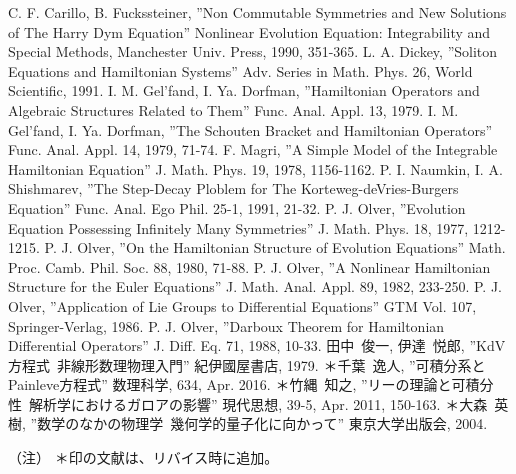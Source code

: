 \documentclass[a4paper, 11pt]{report}
\theoremstyle{definition}
\begin{document}
\newpage

\begin{thebibliography}{99}
 C. F. Carillo, B. Fuckssteiner,
''Non Commutable Symmetries and New Solutions of The Harry Dym Equation'' Nonlinear Evolution Equation: Integrability and Special Methods, Manchester Univ. Press, 1990, 351-365.
 L. A. Dickey,
''Soliton Equations and Hamiltonian Systems'' Adv. Series in Math. Phys. 26, World Scientific, 1991.
 I. M. Gel'fand, I. Ya. Dorfman,
''Hamiltonian Operators and Algebraic Structures Related to Them'' Func. Anal. Appl. 13, 1979.
 I. M. Gel'fand, I. Ya. Dorfman,
''The Schouten Bracket and Hamiltonian Operators'' Func. Anal. Appl. 14, 1979, 71-74.
 F. Magri,
''A Simple Model of the Integrable Hamiltonian Equation'' J. Math. Phys. 19, 1978, 1156-1162.
 P. I. Naumkin, I. A. Shishmarev,
''The Step-Decay Ploblem for The Korteweg-deVries-Burgers Equation'' Func. Anal. Ego Phil. 25-1, 1991, 21-32.
 P. J. Olver,
''Evolution Equation Possessing Infinitely Many Symmetries'' J. Math. Phys. 18, 1977, 1212-1215.
 P. J. Olver,
''On the Hamiltonian Structure of Evolution Equations'' Math. Proc. Camb. Phil. Soc. 88, 1980, 71-88.
 P. J. Olver,
''A Nonlinear Hamiltonian Structure for the Euler Equations'' J. Math. Anal. Appl. 89, 1982, 233-250.
 P. J. Olver,
''Application of Lie Groups to Differential Equations'' GTM Vol. 107, Springer-Verlag, 1986.
 P. J. Olver,
''Darboux Theorem for Hamiltonian Differential Operators'' J. Diff. Eq. 71, 1988, 10-33.
 田中\ 俊一, 伊達\ 悦郎,
''KdV方程式\ 非線形数理物理入門'' 紀伊國屋書店, 1979.
 ＊千葉\ 逸人,
''可積分系とPainleve方程式'' 数理科学, 634, Apr. 2016.
 ＊竹縄\ 知之,
''リーの理論と可積分性\ 解析学におけるガロアの影響'' 現代思想, 39-5, Apr. 2011, 150-163.
 ＊大森\ 英樹,
''数学のなかの物理学\ 幾何学的量子化に向かって'' 東京大学出版会, 2004.
\end{thebibliography}

（注） ＊︎印の文献は、リバイス時に追加。
\rmfamily
\end{document}
